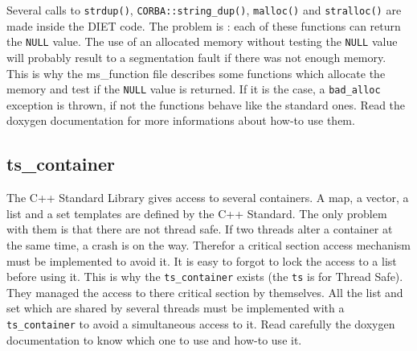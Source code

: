 Several calls to \texttt{strdup()}, \texttt{CORBA::string\_dup()},
\texttt{malloc()} and \texttt{stralloc()} are made inside the DIET code. The
problem is : each of these functions can return the \texttt{NULL} value. The
use of an allocated memory without testing the \texttt{NULL} value will
probably result to a segmentation fault if there was not enough memory. This
is why the \textsf{ms\_function} file describes some functions which allocate
the memory and test if the \texttt{NULL} value is returned. If it is the case,
a \texttt{bad\_alloc} exception is thrown, if not the functions behave like the
standard ones. Read the doxygen documentation for more informations about
how-to use them.

\subsection{\textsf{ts\_container}}

The C++ Standard Library gives access to several containers. A map, a vector, a
list and a set templates are defined by the C++ Standard. The only problem with
them is that there are not thread safe. If two threads alter a container at the
same time, a crash is on the way. Therefor a critical section access mechanism
must be implemented to avoid it. It is easy to forgot to lock the access to a
list before using it. This is why the \texttt{ts\_container} exists (the
\texttt{ts} is for Thread Safe). They managed the access to there critical
section by themselves. All the list and set which are shared by several threads
must be implemented with a \texttt{ts\_container} to avoid a simultaneous
access to it. Read carefully the doxygen documentation to know which one to use
and how-to use it.
